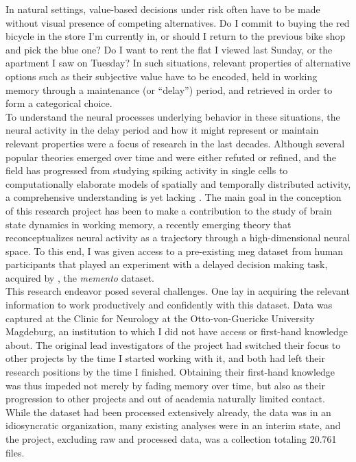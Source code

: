 In natural settings, value-based decisions under risk often have to be made without visual presence of competing alternatives.
Do I commit to buying the red bicycle in the store I'm currently in, or should I return to the previous bike shop and pick the blue one?
Do I want to rent the flat I viewed last Sunday, or the apartment I saw on Tuesday?
In such situations, relevant properties of alternative options such as their subjective value have to be encoded, held in working memory through a maintenance (or ``delay'') period, and retrieved in order to form a categorical choice.\\
To understand the neural processes underlying behavior in these situations, the neural activity in the delay period and how it might represent or maintain relevant properties were a focus of research in the last decades.
Although several popular theories emerged over time and were either refuted or refined, and the field has progressed from studying spiking activity in single cells to computationally elaborate models of spatially and temporally distributed activity, a comprehensive understanding is yet lacking \citep{sreenivasan2019and}.
The main goal in the conception of this research project has been to make a contribution to the study of brain state dynamics in working memory, a recently emerging theory that reconceptualizes neural activity as a trajectory through a high-dimensional neural space.
To this end, I was given access to a pre-existing \gls{meg} dataset from human participants that played an experiment with a delayed decision making task, acquired by \citet{kaiser}, the \textit{memento} dataset.\\
This research endeavor posed several challenges.
One lay in acquiring the relevant information to work productively and confidently with this dataset.
Data was captured at the Clinic for Neurology at the Otto-von-Guericke University Magdeburg, an institution to which I did not have access or first-hand knowledge about.
The original lead investigators of the project had switched their focus to other projects by the time I started working with it, and both had left their research positions by the time I finished.
Obtaining their first-hand knowledge was thus impeded not merely by fading memory over time, but also as their progression to other projects and out of academia naturally limited contact.
While the dataset had been processed extensively already, the data was in an idiosyncratic organization, many existing analyses were in an interim state, and the project, excluding raw and processed data, was a collection totaling 20.761 files.
